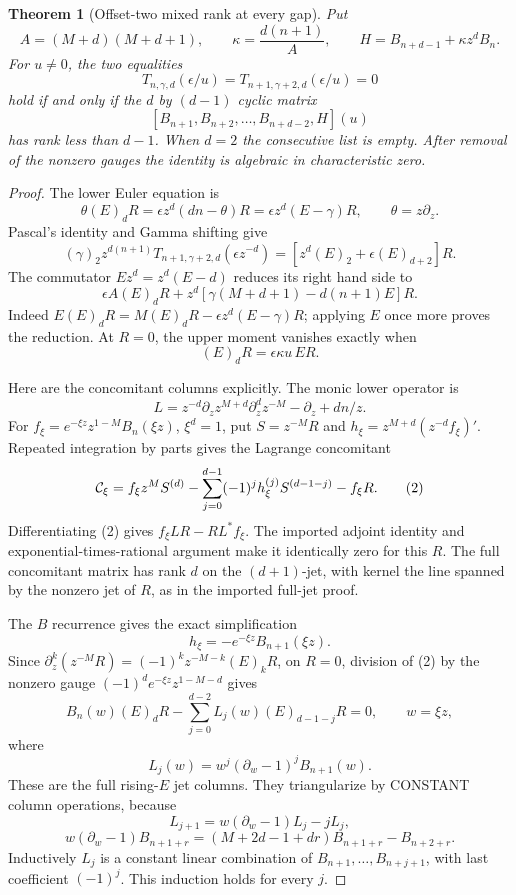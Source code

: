 \documentclass[11pt]{article}
\newtheorem{theorem}{Theorem}
\begin{document}
\begin{theorem}[Offset-two mixed rank at every gap]\label{thm:mixed}
Put
\[
 A=(M+d)(M+d+1),\qquad \kappa=\frac{d(n+1)}A,\qquad
 H=B_{n+d-1}+\kappa z^dB_n.
\]
For $u\ne0$, the two equalities
\[
 T_{n,\gamma,d}(\epsilon/u)
   =T_{n+1,\gamma+2,d}(\epsilon/u)=0
\]
hold if and only if the $d$ by $(d-1)$ cyclic matrix
\[
 [B_{n+1},B_{n+2},\ldots,B_{n+d-2},H](u)
\]
has rank less than $d-1$. When $d=2$ the consecutive list is empty.
After removal of the nonzero gauges the identity is algebraic
in characteristic zero.
\end{theorem}
\begin{proof}
The lower Euler equation is
\[
 \theta(E)_dR=\epsilon z^d(dn-\theta)R
             =\epsilon z^d(E-\gamma)R,\qquad \theta=z\partial_z.
\]
Pascal's identity and Gamma shifting give
\[
 (\gamma)_2z^{d(n+1)}
       T_{n+1,\gamma+2,d}(\epsilon z^{-d})
   =[z^d(E)_2+\epsilon(E)_{d+2}]R.
\]
The commutator $Ez^d=z^d(E-d)$ reduces its right hand side to
\[
 \epsilon A(E)_dR+
 z^d[\gamma(M+d+1)-d(n+1)E]R.
\]
Indeed $E(E)_dR=M(E)_dR-\epsilon z^d(E-\gamma)R$;
applying $E$ once more proves the reduction. At $R=0$, the upper
moment vanishes exactly when
\[
 (E)_dR=\epsilon\kappa u\,ER.                         \tag{1}
\]

Here are the concomitant columns explicitly.
The monic lower operator is
\[
 L=z^{-d}\partial_z z^{M+d}\partial_z^d z^{-M}
       -\partial_z+dn/z.
\]
For $f_\xi=e^{-\xi z}z^{1-M}B_n(\xi z)$, $\xi^d=1$, put
$S=z^{-M}R$ and $h_\xi=z^{M+d}(z^{-d}f_\xi)'$.
Repeated integration by parts gives the Lagrange concomitant
\[
 {\cal C}_\xi=
 f_\xi z^MS^{(d)}
 -\sum_{j=0}^{d-1}(-1)^jh_\xi^{(j)}S^{(d-1-j)}
 -f_\xi R.                                           \tag{2}
\]
Differentiating (2) gives $f_\xi LR-RL^*f_\xi$.
The imported adjoint identity and exponential-times-rational
argument make it identically zero for this $R$.
The full concomitant matrix has rank $d$ on the $(d+1)$-jet,
with kernel the line spanned by the nonzero jet of $R$,
as in the imported full-jet proof.

The $B$ recurrence gives the exact simplification
\[
 h_\xi=-e^{-\xi z}B_{n+1}(\xi z).
\]
Since
$\partial_z^k(z^{-M}R)=(-1)^kz^{-M-k}(E)_kR$,
on $R=0$, division of (2) by the nonzero gauge
$(-1)^de^{-\xi z}z^{1-M-d}$ gives
\[
 B_n(w)(E)_dR-
   \sum_{j=0}^{d-2}L_j(w)(E)_{d-1-j}R=0,\qquad w=\xi z,       \tag{3}
\]
where
\[
 L_j(w)=w^j(\partial_w-1)^jB_{n+1}(w).
\]
These are the full rising-$E$ jet columns.
They triangularize by CONSTANT column operations, because
\[
 L_{j+1}=w(\partial_w-1)L_j-jL_j,
\]
\[
 w(\partial_w-1)B_{n+1+r}
    =(M+2d-1+dr)B_{n+1+r}-B_{n+2+r}.
\]
Inductively $L_j$ is a constant linear combination of
$B_{n+1},\ldots,B_{n+j+1}$, with last coefficient $(-1)^j$.
This induction holds for every $j$.


\end{proof}
\end{document}
